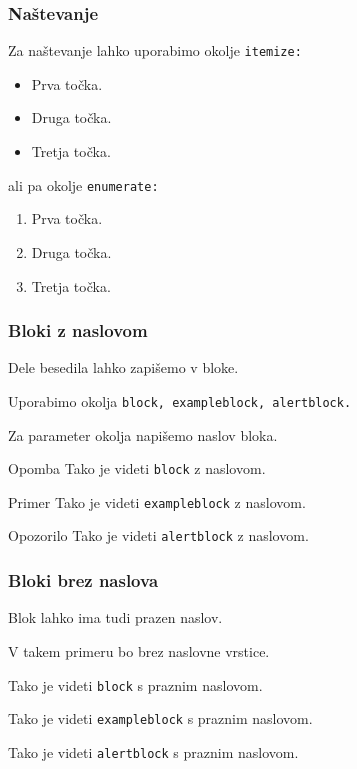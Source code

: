 \documentclass{beamer}
\begin{document}
\begin{frame}

\frametitle{Naštevanje}
   Za naštevanje lahko uporabimo okolje \texttt{itemize:}
\begin{itemize}
\item      Prva točka.
\item      Druga točka.
\item      Tretja točka.
\end{itemize}
   ali pa okolje \texttt{enumerate:}
\begin{enumerate}
\item      Prva točka.
\item      Druga točka.
\item      Tretja točka.
\end{enumerate}
\end{frame}
\begin{frame}
\frametitle   {Bloki z naslovom}
   Dele besedila lahko zapišemo v bloke.

   Uporabimo okolja \texttt{block, exampleblock, alertblock.}

   Za parameter okolja napišemo naslov bloka.
\begin{block}{Opomba}
      Tako je videti \texttt{block} z naslovom.
\end{block}
\begin{exampleblock}{Primer}
      Tako je videti \texttt{exampleblock} z naslovom.
\end{exampleblock}
\begin{alertblock}{Opozorilo}
      Tako je videti \texttt{alertblock} z naslovom.
\end{alertblock}
\end{frame}
\begin{frame}
\frametitle   {Bloki brez naslova}
   Blok lahko ima tudi prazen naslov.

   V takem primeru bo brez naslovne vrstice.
\begin{block}{}      Tako je videti \texttt{block} s praznim naslovom.
\end{block}
\begin{exampleblock}{}      Tako je videti \texttt{exampleblock} s praznim naslovom.
\end{exampleblock}
\begin{alertblock}{}
      Tako je videti \texttt{alertblock} s praznim naslovom.
\end{alertblock}
\end{frame}
\end{document}
